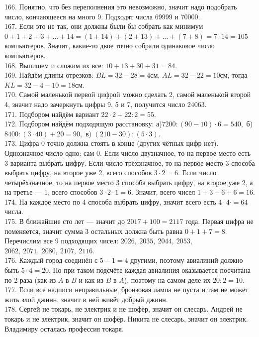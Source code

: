 \documentclass[12pt]{article}
\begin{document}
166. Понятно, что без переполнения это невозможно, значит надо подобрать число, кончающееся на много 9. Подходят числа 69999 и 70000.\\
167. Если это не так, они должны были бы собрать как минимум $0+1+2+3+\ldots+14=(1+14)+(2+13)+\ldots+(7+8)=7\cdot14=105$ компьютеров. Значит, какие-то двое точно собрали одинаковое число компьютеров.\\
168. Выпишем и сложим их все: $10+13+30+31=84.$\\
169. Найдём длины отрезков: $BL=32-28=4$см, $AL=32-22=10$см, тогда $KL=32-4-10=18$см.\\
170. Самой маленькой первой цифрой можно сделать 2, самой маленькой второй 4, значит надо зачеркнуть цифры 9, 5 и 7, получится число 24063.\\
171. Подбором найдём вариант $22\cdot2+22:2=55.$\\
172. Подбором найдём подходящую расстановку: а)$7200:(90-10)\cdot6=540,$ б) $8400:(3\cdot40)+20=90,$ в) $(210-30):(5\cdot3).$\\
173. Цифра 0 точно должна стоять в конце (других чётных цифр нет). Однозначное число одно: сам 0. Если число двузначное, то на первое место есть 3 варианта выбрать цифру. Если число трёхзначное, то на первое место 3 способа выбрать цифру, на второе уже 2, всего способов $3\cdot2=6.$ Если число четырёхзначное, то на первое место 3 способа выбрать цифру, на второе уже 2, а на третье --- 1, всего способов $3\cdot2\cdot1=6.$ Значит, всего чисел $1+3+6+6=16.$\\
174. На каждое место по 4 способа выбрать цифру, значит всего есть $4\cdot4\cdot=64$ числа.\\
175. В ближайшие сто лет --- значит до $2017+100=2117$ года. Первая цифра не поменяется, значит сумма 3 остальных должна быть равна $0+1+7=8.$ Перечислим все 9 подходящих чисел: $2026,\ 2035,\ 2044,\ 2053,$\\$2062,\ 2071,\ 2080,\ 2107,\ 2116.$\\
176. Каждый город соединён с $5-1=4$ другими, поэтому авиалиний должно быть $5\cdot4=20.$ Но при таком подсчёте каждая авиалиния оказывается посчитана по 2 раза (как из $A$ в $B$ и как из $B$ в $A$), поэтому на самом деле их $20:2=10.$\\
177. Если все надписи неправильные, бронзовая лампа не пуста и там не может жить злой джинн, значит в ней живёт добрый джинн.\\
178. Сергей не токарь, не электрик и не шофёр, значит он слесарь. Андрей не токарь и не электрик, значит он шофёр. Никита не слесарь, значит он электрик. Владимиру осталась профессия токаря.\\
\end{document}
